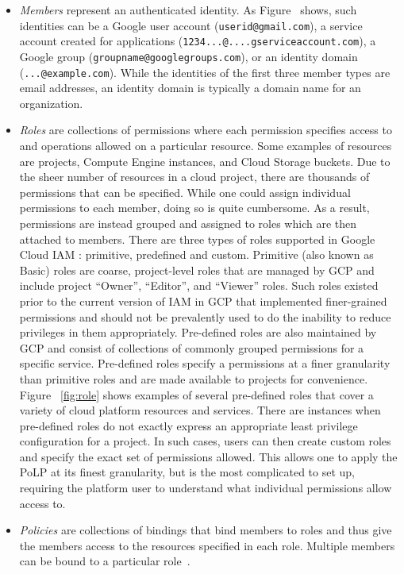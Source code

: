\begin{itemize}
\item {\em Members} represent an authenticated identity.  As Figure~ shows, such identities can be a Google user account
({\tt userid@gmail.com}), a service account created for applications ({\tt 1234...@....gserviceaccount.com}), a Google group ({\tt groupname@googlegroups.com}), or an identity domain ({\tt ...@example.com}). While the identities of the first three member types are email 
addresses, an identity domain is typically a domain name for an organization.

\item {\em Roles} are collections of permissions where each permission specifies access to and operations allowed on a particular resource.
Some examples of resources are projects, Compute Engine instances, and Cloud Storage buckets.  Due to the sheer number of 
resources in a cloud project, there are thousands of permissions that can be specified.  While one could assign individual
permissions to each member, doing so is quite cumbersome.  As a result, permissions are instead grouped and assigned to roles which are
then attached to members.  There are three types of roles supported in Google Cloud IAM \cite{googlecloudrole}: primitive, predefined and custom.
Primitive (also known as Basic) roles are coarse, project-level roles that are managed by GCP and include project ``Owner'', ``Editor'', and 
``Viewer'' roles.  Such roles existed prior to the current version of IAM in GCP that implemented finer-grained permissions and should not
be prevalently used to do the inability to reduce privileges in them appropriately.  Pre-defined roles are also maintained by GCP and
consist of collections of commonly grouped permissions for a specific service.  Pre-defined roles specify a permissions at a finer granularity 
than primitive roles and are made available to projects for convenience.  Figure ~\ref{fig:role} shows examples of several pre-defined roles that cover a variety of cloud platform resources and services.  There are instances when pre-defined roles do not exactly express an appropriate least privilege configuration for
a project.  In such cases, users can then create custom roles and specify the exact set of permissions
allowed.  This allows one to apply the PoLP at its finest granularity, but is the most complicated to set up, requiring the platform user to understand what individual permissions allow access to.

\item {\em Policies} are collections of bindings that bind members to roles and thus give the members access to the resources specified in
each role.  Multiple members can be bound to a particular role~\cite{Googlecloudiam}. 
\end{itemize}

